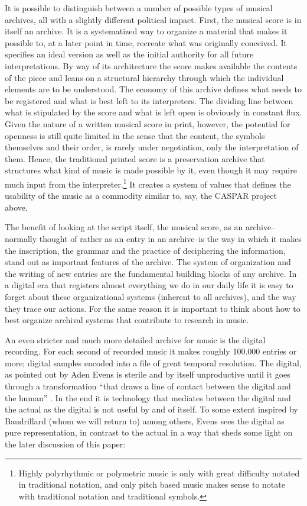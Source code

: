 \documentclass[11pt,a4paper]{article}
\begin{document}
It is possible to distinguish between a number of possible types of musical archives, all with a slightly different political impact. First, the musical score is in itself an archive. It is a systematized way to organize a material that makes it possible to, at a later point in time, recreate what was originally conceived. It specifies an ideal version as well as the initial authority for all future interpretations. By way of its architecture the score makes available the contents of the piece and leans on a structural hierarchy through which the individual elements are to be understood. The economy of this archive defines what needs to be registered and what is best left to its interpreters. The dividing line between what is stipulated by the score and what is left open is obviously in constant flux. Given the nature of a written musical score in print, however, the potential for openness is still quite limited in the sense that the content, the symbols themselves and their order, is rarely under negotiation, only the interpretation of them. Hence, the traditional printed score is a preservation archive that structures what kind of music is made possible by it, even though it may require much input from the interpreter.\footnote{Highly polyrhythmic or polymetric music is only with great difficulty notated in traditional notation, and only pitch based music makes sense to notate with traditional notation and traditional symbols.} It creates a system of values that defines the usability of the music as a commodity similar to, say, the CASPAR project above.

The benefit of looking at the script itself, the musical score, as an archive--normally thought of rather as an entry in an archive--is the way in which it makes the inscription, the grammar and the practice of deciphering the information, stand out as important features of the archive. The system of organization and the writing of new entries are the fundamental building blocks of any archive. In a digital era that registers almost everything we do in our daily life it is easy to forget about these organizational systems (inherent to all archives), and the way they trace our actions. For the same reason it is important to think about how to best organize archival systems that contribute to research in music.

An even stricter and much more detailed archive for music is the digital recording. For each second of recorded music it makes roughly 100.000 entries or more; digital samples encoded into a file of great temporal resolution. The digital, as pointed out by Aden Evens \citep[p. 79]{evens05} is sterile and by itself unproductive until it goes through a transformation ``that draws a line of contact between the digital and the human'' \citep[p. 79]{evens05}. In the end it is technology that mediates between the digital and the actual as the digital is not useful by and of itself. To some extent inspired by Baudrillard (whom we will return to) among others, Evens sees the digital as pure representation, in contrast to the actual in a way that sheds some light on the later discussion of this paper:
\end{document}

